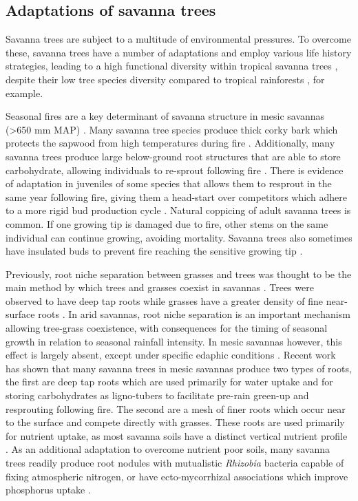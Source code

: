 \begin{refsection}
\subsection{Adaptations of savanna trees}
\label{background:ssec:adapt}

Savanna trees are subject to a multitude of environmental pressures. To overcome these, savanna trees have a number of adaptations and employ various life history strategies, leading to a high functional diversity within tropical savanna trees \citep{Solbrig1996}, despite their low tree species diversity compared to tropical rainforests \citep{Solbrig1996}, for example.

Seasonal fires are a key determinant of savanna structure in mesic savannas (>650 mm MAP) \citep{Sankaran2005}. Many savanna tree species produce thick corky bark which protects the sapwood from high temperatures during fire \citep{Hoffmann2012, Lawes2011, Dantas2013}. Additionally, many savanna trees produce large below-ground root structures that are able to store carbohydrate, allowing individuals to re-sprout following fire \citep{Wigley2019}. There is evidence of adaptation in juveniles of some species that allows them to resprout in the same year following fire, giving them a head-start over competitors which adhere to a more rigid bud production cycle \citep{Wiegand2006}. Natural coppicing of adult savanna trees is common. If one growing tip is damaged due to fire, other stems on the same individual can continue growing, avoiding mortality. Savanna trees also sometimes have insulated buds to prevent fire reaching the sensitive growing tip \citep{CharlesDominique2015}.

Previously, root niche separation between grasses and trees was thought to be the main method by which trees and grasses coexist in savannas \citep{Walter1971}. Trees were observed to have deep tap roots while grasses have a greater density of fine near-surface roots \citep{Timberlake1993}. In arid savannas, root niche separation is an important mechanism allowing tree-grass coexistence, with consequences for the timing of seasonal growth in relation to seasonal rainfall intensity. In mesic savannas however, this effect is largely absent, except under specific edaphic conditions \citep{Case2020, Ketter2018, Sankaran2004, Higgins2000}. Recent work has shown that many savanna trees in mesic savannas produce two types of roots, the first are deep tap roots which are used primarily for water uptake and for storing carbohydrates as ligno-tubers to facilitate pre-rain green-up and resprouting following fire. The second are a mesh of finer roots which occur near to the surface and compete directly with grasses. These roots are used primarily for nutrient uptake, as most savanna soils have a distinct vertical nutrient profile \citep{Tomlinson2012, February2013}.  As an additional adaptation to overcome nutrient poor soils, many savanna trees readily produce root nodules with mutualistic \textit{Rhizobia} bacteria capable of fixing atmospheric nitrogen, or have ecto-mycorrhizal associations which improve phosphorus uptake \citep{Hogberg1986}. 


\end{refsection}

